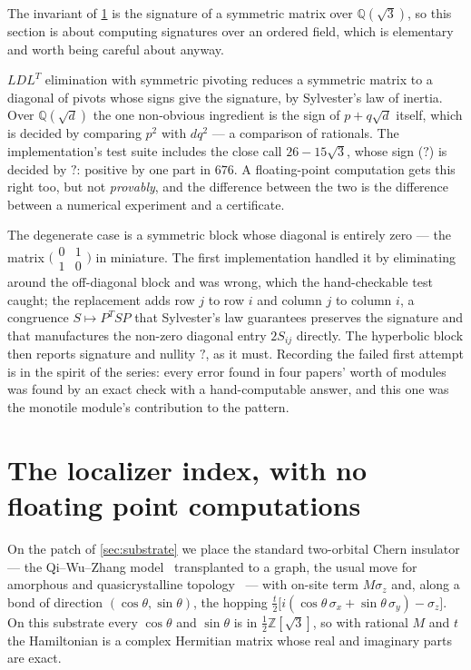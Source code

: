 \documentclass[11pt,a4paper]{article}
\newcommand{\MTHypSig}{?}\newcommand{\MTClosePivot}{?}
\newcommand{\MTClosePivotRatio}{?}\newcommand{\MTLocSize}{?}
\newcommand{\QQ}{\mathbb{Q}}
\newcommand{\ZZ}{\mathbb{Z}}
\theoremstyle{definition}
\begin{document}
The invariant of \cref{sec:localizer} is the signature of a symmetric
matrix over $\QQ(\sqrt3)$, so this section is about computing signatures
over an ordered field, which is elementary and worth being careful about
anyway.

$LDL^T$ elimination with symmetric pivoting reduces a symmetric matrix to a
diagonal of pivots whose signs give the signature, by Sylvester's law of
inertia. Over $\QQ(\sqrt d)$ the one non-obvious ingredient is the sign of
$p + q\sqrt d$ itself, which is decided by comparing $p^2$ with $d q^2$ ---
a comparison of rationals. The implementation's test suite includes the
close call $26 - 15\sqrt3$, whose sign ($\MTClosePivot$) is decided by
$\MTClosePivotRatio$: positive by one part in $676$. A floating-point
computation gets this right too, but not \emph{provably}, and the difference
between the two is the difference between a numerical experiment and a
certificate.

The degenerate case is a symmetric block whose diagonal is entirely zero
--- the matrix $\bigl(\begin{smallmatrix}0&1\\1&0\end{smallmatrix}\bigr)$ in
miniature. The first implementation handled it by eliminating around the
off-diagonal block and was wrong, which the hand-checkable test caught; the
replacement adds row $j$ to row $i$ and column $j$ to column $i$, a
congruence $S \mapsto P^T S P$ that Sylvester's law \cite{Sylvester1852} guarantees preserves the
signature and that manufactures the non-zero diagonal entry $2S_{ij}$
directly. The hyperbolic block then reports signature and nullity
$\MTHypSig$, as it must. Recording the failed first attempt is in the
spirit of the series: every error found in four papers' worth of modules was
found by an exact check with a hand-computable answer, and this one was the
monotile module's contribution to the pattern.


\section{The localizer index, with no floating point computations}
\label{sec:localizer}

On the patch of \cref{sec:substrate} we place the standard two-orbital
Chern insulator --- the Qi--Wu--Zhang model~\cite{QWZ2006} transplanted to a
graph, the usual move for amorphous and quasicrystalline
topology~\cite{Agarwala2017, Resta2011} --- with on-site term $M\sigma_z$ and, along a
bond of direction $(\cos\theta, \sin\theta)$, the hopping
$\tfrac{t}{2}\bigl[i(\cos\theta\,\sigma_x + \sin\theta\,\sigma_y) -
\sigma_z\bigr]$. On this substrate every $\cos\theta$ and $\sin\theta$ is in
$\tfrac12\ZZ[\sqrt3]$, so with rational $M$ and $t$ the Hamiltonian is a
complex Hermitian matrix whose real and imaginary parts are exact.
\end{document}
